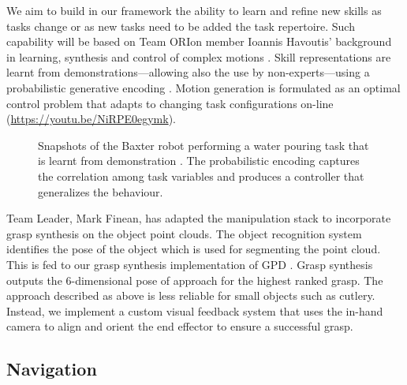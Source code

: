 \documentclass[runningheads,a4paper]{llncs}
\newcommand{\teamori}{Team ORIon}
\begin{document}
We aim to build in our framework the ability
to learn and refine new skills as tasks change or as new tasks need to be added
the task repertoire. Such capability will be based on \teamori{} 
member Ioannis Havoutis' background in learning, synthesis and control of 
complex motions \cite{Havoutis16SSRR}. Skill representations
are learnt from demonstrations---allowing also the use by non-experts---using a probabilistic generative encoding \cite{Havoutis17ICRA}. Motion generation is formulated as an optimal control problem that adapts to changing task configurations on-line \cite{Zeestraten17IROS,Zeestraten2017-RAL} (\url{https://youtu.be/NiRPE0egymk}).
\begin{figure}[!t]
	\centering
	\vspace{-10pt}%
	\caption{Snapshots of the Baxter robot performing a water pouring task that
	is learnt from demonstration \cite{Zeestraten2017-RAL}. The probabilistic
	encoding captures the correlation among task variables and produces a
	controller that generalizes the behaviour.}
	\label{fig:baxter_water_task}
	\vspace{-3ex}
\end{figure}
Team Leader, Mark Finean, has adapted the manipulation stack to incorporate grasp synthesis on the object point clouds. The object recognition system identifies the pose of the object which is used for segmenting the point cloud. This is fed to our grasp synthesis implementation of GPD \cite{GPD1} \cite{GPD2}. Grasp synthesis outputs the 6-dimensional pose of approach for the highest ranked grasp. The approach described as above is less reliable for small objects such as cutlery. Instead, we implement a custom visual feedback system that uses the in-hand camera to align and orient the end effector to ensure a successful grasp.  

\subsection{Navigation}
\end{document}
